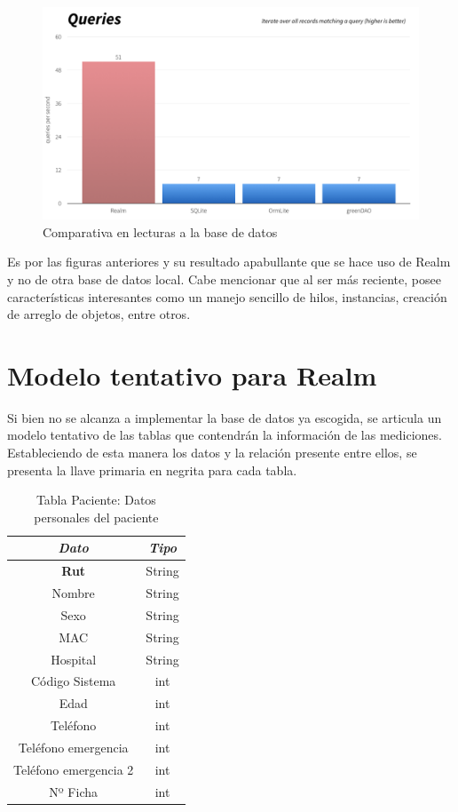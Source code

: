 \begin{figure}[H]
	\centering
	\includegraphics[scale=0.4]{figuras/proto2/queries.png}
	\caption{Comparativa en lecturas a la base de datos}
	\label{queries}
\end{figure}

Es por las figuras anteriores y su resultado apabullante que se hace uso de Realm y no de otra base de datos local. Cabe mencionar que al ser más reciente, posee características interesantes como un manejo sencillo de hilos, instancias, creación de arreglo de objetos, entre otros.

\newpage

\section{Modelo tentativo para Realm}

Si bien no se alcanza a implementar la base de datos ya escogida, se articula un modelo tentativo de las tablas que contendrán la información de las mediciones. Estableciendo de esta manera los datos y la relación presente entre ellos, se presenta la llave primaria en negrita para cada tabla.

\begin{table}[H]
	\centering
	\begin{tabular}{| c | c |}
		\hline
		\multicolumn{1}{|c|}{\textit{Dato}}&
		\multicolumn{1}{c|}{\textit{Tipo}}\\ \hline
		\textbf{Rut}  & String   \\ \hline
		Nombre  & String  \\ \hline
		Sexo & String  \\ \hline
		MAC & String  \\ \hline
		Hospital & String  \\ \hline
		Código Sistema & int  \\ \hline
		Edad & int  \\ \hline
		Teléfono & int  \\ \hline
		Teléfono emergencia & int  \\ \hline
		Teléfono emergencia 2 & int  \\ \hline
		Nº Ficha & int  \\ \hline
	\end{tabular}
	\caption{Tabla Paciente: Datos personales del paciente}
	\label{tabla_paciente}
\end{table}


